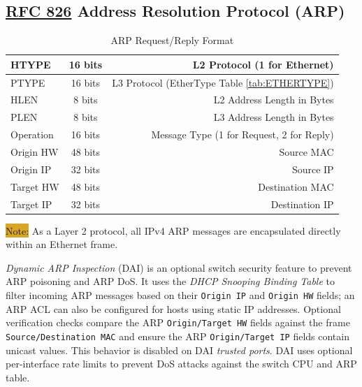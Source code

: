 \documentclass[12pt]{article}
\newcommand{\note}[1]{\colorbox{#1}{Note:}}
\newcommand{\RFC}[1]{\href{https://datatracker.ietf.org/doc/html/rfc#1}{RFC #1}}
\begin{document}
	\subsection{\RFC{826} Address Resolution Protocol (ARP) \label{subsec:ARP}}
	\begin{table}[H]
	\centering
	\caption{ARP Request/Reply Format \label{tab:ARP}}
	\begin{tabular}{| l | c | r |}
	\hline
	HTYPE	& 16 bits	& L2 Protocol (1 for Ethernet)\\\hline
	PTYPE	& 16 bits	& L3 Protocol (EtherType Table \ref{tab:ETHERTYPE})\\\hline
	HLEN		& 8 bits	& L2 Address Length in Bytes\\\hline
	PLEN		& 8 bits	& L3 Address Length in Bytes\\\hline
	Operation	& 16 bits	& Message Type (1 for Request, 2 for Reply)\\\hline
	Origin HW 	& 48 bits	& Source MAC\\\hline
	Origin IP	& 32 bits	& Source IP\\\hline
	Target HW 	& 48 bits	& Destination MAC\\\hline
	Target IP	& 32 bits	& Destination IP\\\hline
	\end{tabular}\end{table}
	\note{Goldenrod} As a Layer 2 protocol, all IPv4 ARP messages are encapsulated directly within an Ethernet frame.
	
	\textit{Dynamic ARP Inspection} (DAI) is an optional switch security feature to prevent ARP poisoning and ARP DoS. It uses the \textit{DHCP Snooping Binding Table} to filter incoming ARP messages based on their \texttt{Origin IP} and \texttt{Origin HW} fields; an ARP ACL can also be configured for hosts using static IP addresses. Optional verification checks compare the ARP \texttt{Origin/Target HW} fields against the frame \texttt{Source/Destination MAC} and ensure the ARP \texttt{Origin/Target IP} fields contain unicast values. This behavior is disabled on DAI \textit{trusted ports}. DAI uses optional per-interface rate limits to prevent DoS attacks against the switch CPU and ARP table.


\end{document}
